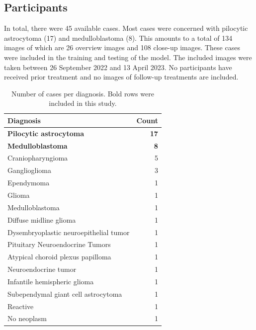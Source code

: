 \subsection{Participants}
In total, there were 45 available cases.
Most cases were concerned with pilocytic astrocytoma (17) and medulloblastoma (8).
This amounts to a total of 134 images of which are 26 overview images and 108 close-up images.
These cases were included in the training and testing of the model.
The included images were taken between 26 September 2022 and 13 April 2023.
No participants have received prior treatment and no images of follow-up treatments are included.

\begin{table}
    \caption[Number of cases per diagnosis]{
        Number of cases per diagnosis.
        Bold rows were included in this study.
    }
    \label{tab:available_data}
    \begin{tabular}{lr}
        \toprule
        Diagnosis &  Count \\
        \midrule
        \textbf{Pilocytic astrocytoma}               &         \textbf{17} \\
        \textbf{Medulloblastoma}                     &          \textbf{8} \\
        Craniopharyngioma                   &          5 \\
        Ganglioglioma                       &          3 \\
        Ependymoma                          &          1 \\
        Glioma                              &          1 \\
        Medulloblastoma                  &          1 \\
        Diffuse midline glioma              &          1 \\
        Dysembryoplastic neuroepithelial tumor  &          1 \\
        Pituitary Neuroendocrine Tumors               &          1 \\
        Atypical choroid plexus papilloma   &          1 \\
        Neuroendocrine tumor                &          1 \\
        Infantile hemispheric glioma        &          1 \\
        Subependymal giant cell astrocytoma &          1 \\
        Reactive                            &          1 \\
        No neoplasm                         &          1 \\
        \bottomrule
    \end{tabular}
\end{table}

